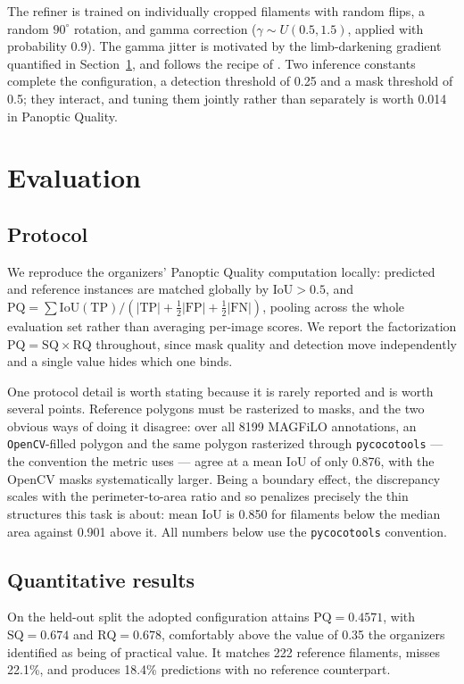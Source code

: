 \documentclass[sigconf]{acmart}
\begin{document}
    The refiner is trained on individually cropped filaments with random flips, a random $90^\circ$ rotation, and gamma correction ($\gamma\sim U(0.5,1.5)$, applied with probability 0.9). The gamma jitter is motivated by the limb-darkening gradient quantified in Section~\ref{sec:evaluation}, and follows the recipe of \citet{hu2026modernconvnet}. Two inference constants complete the configuration, a detection threshold of 0.25 and a mask threshold of 0.5; they interact, and tuning them jointly rather than separately is worth 0.014 in Panoptic Quality.

\section{Evaluation}\label{sec:evaluation}

\subsection{Protocol}
    We reproduce the organizers' Panoptic Quality computation locally: predicted and reference instances are matched globally by $\mathrm{IoU}>0.5$, and $\mathrm{PQ}=\sum\mathrm{IoU}(\mathrm{TP})/(|\mathrm{TP}|+\tfrac12|\mathrm{FP}|+\tfrac12|\mathrm{FN}|)$, pooling across the whole evaluation set rather than averaging per-image scores. We report the factorization $\mathrm{PQ}=\mathrm{SQ}\times\mathrm{RQ}$ throughout, since mask quality and detection move independently and a single value hides which one binds.

    One protocol detail is worth stating because it is rarely reported and is worth several points. Reference polygons must be rasterized to masks, and the two obvious ways of doing it disagree: over all 8199 MAGFiLO annotations, an \texttt{OpenCV}-filled polygon and the same polygon rasterized through \texttt{pycocotools} --- the convention the metric uses --- agree at a mean IoU of only 0.876, with the OpenCV masks systematically larger. Being a boundary effect, the discrepancy scales with the perimeter-to-area ratio and so penalizes precisely the thin structures this task is about: mean IoU is 0.850 for filaments below the median area against 0.901 above it. All numbers below use the \texttt{pycocotools} convention.

\subsection{Quantitative results}
    On the held-out split the adopted configuration attains $\mathrm{PQ}=0.4571$, with $\mathrm{SQ}=0.674$ and $\mathrm{RQ}=0.678$, comfortably above the value of 0.35 the organizers identified as being of practical value. It matches 222 reference filaments, misses 22.1\%, and produces 18.4\% predictions with no reference counterpart.
\end{document}

